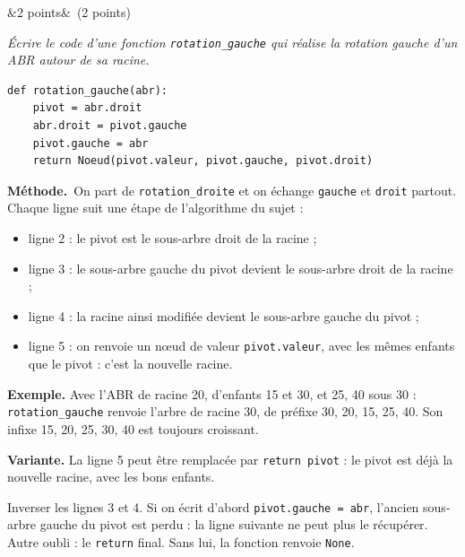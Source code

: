 \documentclass[11pt, a4paper]{exam}
\newcommand{\code}[1]{\texttt{#1}}
\newcommand{\Q}[3]{\par\needspace{5\baselineskip}\bigskip\noindent{\large\bfseries Question #1}\ifx&#2&\else\ \textnormal{(#2)}\fi\par\nopagebreak\smallskip\noindent\textit{#3}\par\nopagebreak\smallskip}
\newcommand{\methode}{\par\noindent\textbf{Méthode.}\ }
\begin{document}
\Q{10}{2 points}{Écrire le code d'une fonction \code{rotation\_gauche} qui réalise la rotation gauche d'un ABR autour de sa racine.}
\begin{reponse}
\begin{lstlisting}
def rotation_gauche(abr):
    pivot = abr.droit
    abr.droit = pivot.gauche
    pivot.gauche = abr
    return Noeud(pivot.valeur, pivot.gauche, pivot.droit)
\end{lstlisting}
\end{reponse}
\methode On part de \code{rotation\_droite} et on échange \code{gauche} et \code{droit} partout. Chaque ligne suit une étape de l'algorithme du sujet :
\begin{itemize}
\item ligne 2 : le pivot est le sous-arbre droit de la racine ;
\item ligne 3 : le sous-arbre gauche du pivot devient le sous-arbre droit de la racine ;
\item ligne 4 : la racine ainsi modifiée devient le sous-arbre gauche du pivot ;
\item ligne 5 : on renvoie un nœud de valeur \code{pivot.valeur}, avec les mêmes enfants que le pivot : c'est la nouvelle racine.
\end{itemize}
\textbf{Exemple.} Avec l'ABR de racine 20, d'enfants 15 et 30, et 25, 40 sous 30 : \code{rotation\_gauche} renvoie l'arbre de racine 30, de préfixe 30, 20, 15, 25, 40. Son infixe 15, 20, 25, 30, 40 est toujours croissant.

\textbf{Variante.} La ligne 5 peut être remplacée par \code{return pivot} : le pivot est déjà la nouvelle racine, avec les bons enfants.
\begin{erreur}
Inverser les lignes 3 et 4. Si on écrit d'abord \code{pivot.gauche = abr}, l'ancien sous-arbre gauche du pivot est perdu : la ligne suivante ne peut plus le récupérer. Autre oubli : le \code{return} final. Sans lui, la fonction renvoie \code{None}.
\end{erreur}
\end{document}
